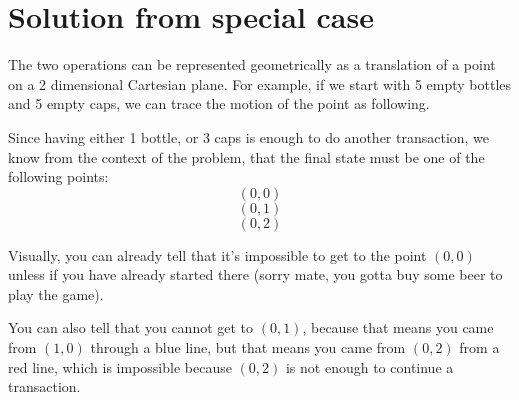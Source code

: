 \documentclass[letterpaper, 12pt]{article}
\begin{document}
\section{Solution from special case}
\par The two operations can be represented geometrically as a translation of a point on a 2 dimensional Cartesian plane.
For example, if we start with 5 empty bottles and 5 empty caps, we can trace the motion of the point as following.
\begin{center}
\end{center}
Since having either 1 bottle, or 3 caps is enough to do another transaction, we know from the context of the problem, that the final state must be one of the following points:
$$(0, 0)$$
$$(0, 1)$$
$$(0, 2)$$

Visually, you can already tell that it's impossible to get to the point $(0, 0)$ unless if you have already started there (sorry mate, you gotta buy some beer to play the game).

You can also tell that you cannot get to $(0, 1)$, because that means you came from $(1, 0)$ through a blue line, but that means you came from $(0, 2)$ from a red line, which is impossible because $(0, 2)$ is not enough to continue a transaction.
\end{document}
